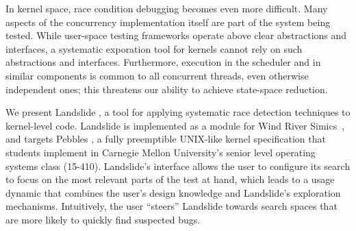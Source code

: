 \documentclass{llncs}
\begin{document}
In kernel space, race condition debugging becomes even more difficult. Many aspects of the concurrency implementation itself are part of the system being tested.
While user-space testing frameworks operate above clear abstractions and interfaces, a systematic exporation tool for kernels cannot rely on such abstractions and interfaces.
Furthermore, execution in the scheduler and in similar components is common to all concurrent threads, even otherwise independent ones; this threatens our ability to achieve state-space reduction.



We present Landslide \cite{landslide},
a tool for applying systematic race detection techniques to kernel-level code.
Landslide is implemented as a module for Wind River Simics\textsuperscript{\texttrademark}~\cite{simics}, and targets Pebbles \cite{kspec}, a fully preemptible UNIX-like kernel specification that students implement in Carnegie Mellon University's senior level operating systems class (15-410).
Landslide's interface allows the user to configure its search to focus on the most relevant parts of the test at hand, which leads to a usage dynamic that combines the user's design knowledge and Landslide's exploration mechanisms. Intuitively, the user ``steers'' Landslide towards search spaces that are more likely to quickly find suspected bugs.
\end{document}
